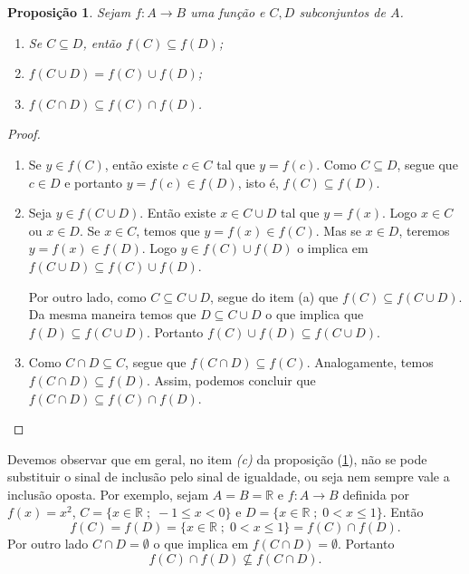 \documentclass[a4paper,12pt]{monografia}
\theoremstyle{plain}
\newtheorem{proposition}{Proposição}[section]
\theoremstyle{definition}
\theoremstyle{remark}
\newcommand{\R}{\mathbb{R}}
\begin{document}
\begin{proposition}\label{Img-direta}
Sejam $f:A \rightarrow B$ uma função e $C, D$ subconjuntos de $A$.
\begin{enumerate}
    \item[(a)] Se $C \subseteq D$, então $f(C)\subseteq f(D)$;
    \item[(b)] $f(C \cup D)=f(C)\cup f(D)$;
    \item[(c)] $f(C \cap D) \subseteq f(C)\cap f(D)$.
\end{enumerate}
\end{proposition}
\begin{proof}\mbox{}
\begin{enumerate}
    \item[(a)] Se $y \in f(C)$, então existe $c \in C$ tal que $y
    = f(c)$. Como $C \subseteq D$, segue que $c \in D$ e portanto
    $y=f(c) \in f(D)$, isto é, $f(C)\subseteq f(D)$.
    \item[(b)] Seja $y \in f(C \cup D)$. Então existe $x \in C \cup
    D$ tal que $y=f(x)$. Logo $x \in C$ ou $x \in D$. Se $x \in
    C$, temos que $y=f(x) \in f(C)$. Mas se $x \in D$, teremos
    $y=f(x) \in f(D)$. Logo $y \in f(C) \cup f(D)$ o implica em
    $f(C \cup D)\subseteq f(C)\cup f(D)$.

    Por outro lado, como $C \subseteq C \cup D$, segue do item (a)
    que $f(C) \subseteq f(C \cup D)$. Da mesma maneira temos que $D
    \subseteq C \cup D$ o que implica que $f(D) \subseteq f(C \cup D)$.
    Portanto $f(C)\cup f(D)\subseteq f(C \cup D)$.
    \item[(c)] Como $C \cap D \subseteq C$, segue que $f(C\cap D)
    \subseteq f(C)$. Analogamente, temos $f(C\cap D)\subseteq
    f(D)$. Assim, podemos concluir que $f(C \cap D) \subseteq
    f(C)\cap f(D)$.
\end{enumerate}
\end{proof}

Devemos observar que em geral, no item \emph{(c)} da proposição
(\ref{Img-direta}), não se pode substituir o sinal de inclusão
pelo sinal de igualdade, ou seja nem sempre vale a inclusão
oposta. Por exemplo, sejam $A=B=\R$ e $f:A \rightarrow B$ definida
por $f(x)=x^2$, $C=\{x \in \R\;;\; -1 \leq x <0\}$ e $D=\{x \in \R
\;;\; 0 <x \leq 1\}$. Então
$$
f(C)=f(D)=\{x \in \R \;;\; 0 <x \leq 1\}=f(C)\cap f(D).
$$
Por outro lado $C \cap D= \emptyset$ o que implica em $f(C \cap
D)=\emptyset$. Portanto $$f(C)\cap f(D) \nsubseteq f(C \cap D).$$
\end{document}
